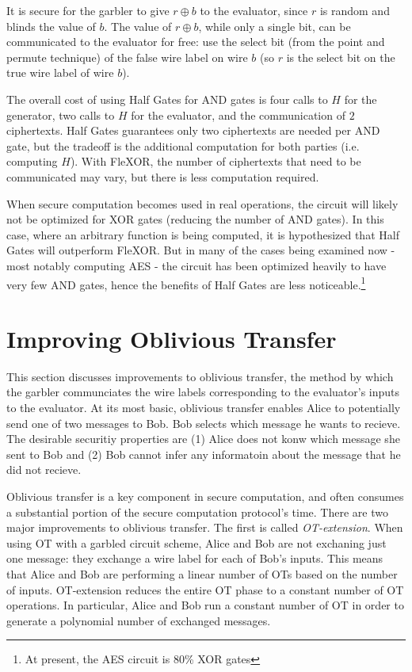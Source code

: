 It is secure for the garbler to give $r \oplus b$ to the evaluator, since $r$ is random and blinds the value of $b$. 
The value of $r \oplus b$, while only a single bit, can be communicated to the evaluator for free: use the select bit (from the point and permute technique) of the false wire label on wire $b$ (so $r$ is the select bit on the true wire label of wire $b$).

The overall cost of using Half Gates for AND gates is four calls to $H$ for the generator, two calls to $H$ for the evaluator, and the communication of $2$ ciphertexts. 
Half Gates guarantees only two ciphertexts are needed per AND gate, but the tradeoff is the additional computation for both parties (i.e. computing $H$).
With FleXOR, the number of ciphertexts that need to be communicated may vary, but there is less computation required.

When secure computation becomes used in real operations, the circuit will likely not be optimized for XOR gates (reducing the number of AND gates). 
In this case, where an arbitrary function is being computed, it is hypothesized that Half Gates will outperform FleXOR. 
But in many of the cases being examined now - most notably computing AES - the circuit has been optimized heavily to have very few AND gates, hence the benefits of Half Gates are less noticeable.\footnote{At present, the AES circuit is 80\% XOR gates} 

\section{Improving Oblivious Transfer}
This section discusses improvements to oblivious transfer, the method by which the garbler communciates the wire labels corresponding to the evaluator's inputs to the evaluator.
At its most basic, oblivious transfer enables Alice to potentially send one of two messages to Bob.
Bob selects which message he wants to recieve.
The desirable securitiy properties are (1) Alice does not konw which message she sent to Bob and (2) Bob cannot infer any informatoin about the message that he did not recieve.

Oblivious transfer is a key component in secure computation, and often consumes a substantial portion of the secure computation protocol's time.
There are two major improvements to oblivious transfer.
The first is called \textit{OT-extension}.
When using OT with a garbled circuit scheme, Alice and Bob are not exchaning just one message: they exchange a wire label for each of Bob's inputs.
This means that Alice and Bob are performing a linear number of OTs based on the number of inputs.
OT-extension reduces the entire OT phase to a constant number of OT operations.
In particular, Alice and Bob run a constant number of OT in order to generate a polynomial number of exchanged messages.

